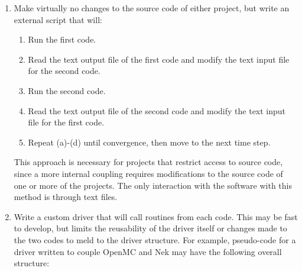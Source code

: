 \documentclass[10pt]{article}
\numberwithin{equation}{section} %
\begin{document}
\begin{enumerate}
\item Make virtually no changes to the source code of either project, but write an external script that will:
	\begin{enumerate}
	\item Run the first code.
	\item Read the text output file of the first code and modify the text input file for the second code.
	\item Run the second code.
	\item Read the text output file of the second code and modify the text input file for the first code. 
	\item Repeat (a)-(d) until convergence, then move to the next time step.
	\end{enumerate}
	This approach is necessary for projects that restrict access to source code, since a more internal coupling requires modifications to the source code of one or more of the projects. The only interaction with the software with this method is through text files.
\item Write a custom driver that will call routines from each code. This may be fast to develop, but limits the reusability of the driver itself or changes made to the two codes to meld to the driver structure. For example, pseudo-code for a driver written to couple OpenMC and Nek may have the following overall structure:


\end{enumerate}
\end{document}
